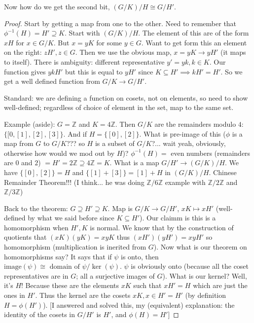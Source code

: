 \documentclass{article}
\theoremstyle{plain}
\theoremstyle{remark}
\newcommand{\Z}{{\mathbb Z}}
\begin{document}
Now how do we get the second bit, $(G/K)/H \cong G / H'$.
\begin{proof}
	Start by getting a map from one to the other.
	Need to remember that $\phi^{-1}(H) = H' \supseteq K$.
	Start with $(G/K)/H$.
	The element of this are of the form $xH$ for $x \in G/K$.
	But $x = yK$ for some $y \in G$.
	Want to get form this an element on the right: $zH', z \in G$.
	Then we use the obvious map, $x = yK \to yH'$ (it maps to itself).
	There is ambiguity: different representative $y' = yk, k \in K$.
	Our function gives $ykH'$ but
	this is equal to $yH'$ since $K \subseteq H' \implies kH' = H'$.
	So we get a well defined function from $G/K \to G/H'$.
	
	Standard: we are defining a function on cosets, not on elements,
	so need to show well-defined;
	regardless of choice of element in the set, map to the same set.

	Example (aside): $G = \Z$ and $K = 4\Z$.
	Then $G/K$ are the remainders modulo $4$: $\{[0,[1],[2],[3]\}$.
	And if $H = \{[0],[2]\}$.
	What is pre-image of this ($\phi$ is a map from $G$ to $G/K$???
	so $H$ is a subset of $G/K$?...
	wait yeah, obviously, otherwise how would we mod out by $H$)?
	$\phi^{-1}(H) =$ even numbers (remainders are $0$ and $2$)
	$= H' = 2\Z \supseteq 4\Z = K$.
	What is a map $G/H' \to (G/K)/H$.
	We have $\{[0],[2]\} = H$ and $\{[1] + [3]\} = [1] + H$
	in $(G/K)/H$.
	Chinese Remainder Theorem!!!
	(I think... he was doing $\Z/6\Z$ example with $\Z/2\Z$ and $\Z/3\Z$)

	Back to the theorem: $G \supseteq H' \supseteq K$.
	Map is $G/K \to G/H'$, $xK \mapsto xH'$
	(well-defined by what we said before since $K \subseteq H'$).
	Our claimm is this is a homomorphism when $H', K$ is normal.
	We know that by the construction of quotients that
	$(xK)(yK) = xyK$ thus $(xH')(yH') = xyH'$ so homomorphism
	(multiplication is inerited from $G$).
	Now what is our theorem on homomorphisms say?
	It says that if $\psi$ is onto,
	then $\mathrm{image}(\psi) \cong \text{ domain of }\psi / \ker(\psi)$.
	$\psi$ is obviously onto (because all the coset representatives are in $G$;
	all a surjective images of $G$).
	What is our kernel?
	Well, it's $H$! Because these are the elements $xK$ such that $xH' = H$
	which are just the ones in $H'$.
	Thus the kernel are the cosets $xK, x \in H' = H'$ (by definition $H = \phi(H')$).
	[I answered and solved this, my (equivalent) explanation:
	the identity of the cosets in $G/H'$ is $H'$,
	and $\phi(H) = H'$]
\end{proof}
\end{document}
